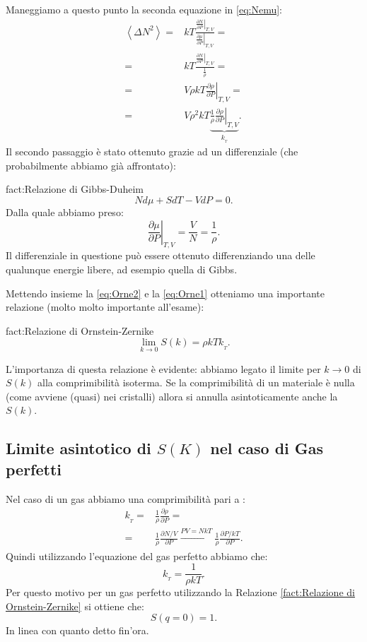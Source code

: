 Maneggiamo a questo punto la seconda equazione in \ref{eq:Nemu}:
\[\begin{aligned}
	\left<\Delta N^2 \right> 
	=&
	kT 
	\frac{\left.\frac{\partial N}{\partial P} \right|_{T,V}}
		{\left.\frac{\partial \mu}{\partial P} \right|_{T,V}}=\\
	=&
	kT \frac{\left.\frac{\partial N}{\partial P} \right|_{T,V}}{\frac{1}{\rho }}=\\
	=&
	V \rho kT \left.\frac{\partial \rho }{\partial P} \right|_{T,V}=\\
	=&
	V\rho ^2kT 
	\underbrace{
	\frac{1}{\rho }\left.\frac{\partial \rho }{\partial P} \right|_{T,V}
	}_{k_{_T}}
	\label{eq:Orne1}
.\end{aligned}\]
Il secondo passaggio è stato ottenuto grazie ad un differenziale (che probabilmente abbiamo già affrontato):
\begin{fact}{fact:Relazione di Gibbs-Duheim}
	\[
		N  d \mu + S dT - V dP = 0
	.\]
	Dalla quale abbiamo preso:
	\[
		\left.\frac{\partial \mu}{\partial P} \right|_{T,V}
			=
			\frac{V}{N} 
			=
			\frac{1}{\rho}
	.\] 
	Il differenziale in questione può essere ottenuto differenziando una delle
	qualunque energie libere, ad esempio quella di Gibbs.
\end{fact}
Mettendo insieme la \ref{eq:Orne2} e la  \ref{eq:Orne1} otteniamo una importante relazione (molto molto importante all'esame):
\begin{fact}{fact:Relazione di Ornstein-Zernike}
	\[
		\lim_{k \to 0} S(k) = \rho kT k_{_{T}}
	.\] 
\end{fact}
L'importanza di questa relazione è evidente: abbiamo legato il limite per $k\to 0$ di $S(k)$ alla comprimibilità isoterma. Se la comprimibilità di un materiale è nulla (come avviene (quasi) nei cristalli) allora si annulla asintoticamente anche la $S(k)$.
\subsection{Limite asintotico di $S(K)$ nel caso di Gas perfetti}
\label{subsec:Limite asintotico di $S(K)$ nel caso di Gas e liquidi}
Nel caso di un gas abbiamo una comprimibilità pari a :
\[\begin{aligned}
	k_{_T} =& \frac{1}{\rho }\frac{\partial \rho }{\partial P} =\\
	=&
	\frac{1}{\rho }\frac{\partial N/V}{\partial P}
	\xrightarrow[]{PV=NkT} \frac{1}{\rho } \frac{\partial P /kT}{\partial P} 
.\end{aligned}\]
Quindi utilizzando l'equazione del gas perfetto abbiamo che:
\[
	k_{_T} = \frac{1}{\rho kT}
.\] 
Per questo motivo per un gas perfetto utilizzando la Relazione \ref{fact:Relazione di Ornstein-Zernike} si ottiene che:
\[
	S(q=0)=1
.\] 
In linea con quanto detto fin'ora.

